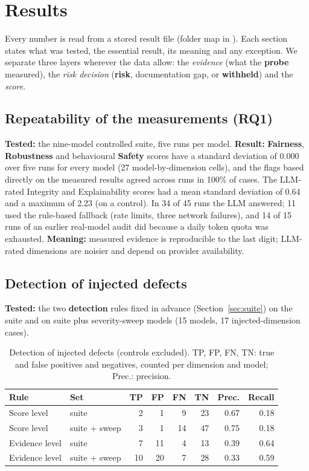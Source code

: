 \chapter{Results}\label{ch:results}

Every number is read from a stored result file (folder map in ). Each section states what was tested, the essential result, its meaning and any exception. We separate three layers wherever the data allow: the \emph{evidence} (what the \textbf{probe} measured), the \emph{risk decision} (\textbf{risk}, documentation gap, or \textbf{withheld}) and the \emph{score}.

\section{Repeatability of the measurements (RQ1)}\label{sec:repeat}
\textbf{Tested:} the nine-model controlled suite, five runs per model. \textbf{Result:} \textbf{Fairness}, \textbf{Robustness} and behavioural \textbf{Safety} scores have a standard deviation of 0.000 over five runs for every model (27 model-by-dimension cells), and the flags based directly on the measured results agreed across runs in 100\% of cases. The LLM-rated Integrity and Explainability scores had a mean standard deviation of 0.64 and a maximum of 2.23 (on a control). In 34 of 45 runs the LLM answered; 11 used the rule-based fallback (rate limits, three network failures), and 14 of 15 runs of an earlier real-model audit did because a daily token quota was exhausted. \textbf{Meaning:} measured evidence is reproducible to the last digit; LLM-rated dimensions are noisier and depend on provider availability.

\section{Detection of injected defects}\label{sec:detect}
\textbf{Tested:} the two \textbf{detection} rules fixed in advance (Section~\ref{sec:suite}) on the suite and on suite plus severity-sweep models (15 models, 17 injected-dimension cases).

\begin{table}[!htbp]
\centering\small
\caption{Detection of injected defects (controls excluded). TP, FP, FN, TN: true and false positives and negatives, counted per dimension and model; Prec.: precision.}\label{tab:detect}
\begin{tabularx}{\textwidth}{|>{\raggedright\arraybackslash}p{2.8cm}|l|R|R|R|R|R|R|}
\hline
\textbf{Rule} & \textbf{Set} & \textbf{TP} & \textbf{FP} & \textbf{FN} & \textbf{TN} & \textbf{Prec.} & \textbf{Recall}\\
\hline
Score level & suite & 2 & 1 & 9 & 23 & 0.67 & 0.18\\ \hline
Score level & suite + sweep & 3 & 1 & 14 & 47 & 0.75 & 0.18\\ \hline
Evidence level & suite & 7 & 11 & 4 & 13 & 0.39 & 0.64\\ \hline
Evidence level & suite + sweep & 10 & 20 & 7 & 28 & 0.33 & 0.59\\
\hline
\end{tabularx}
\end{table}

